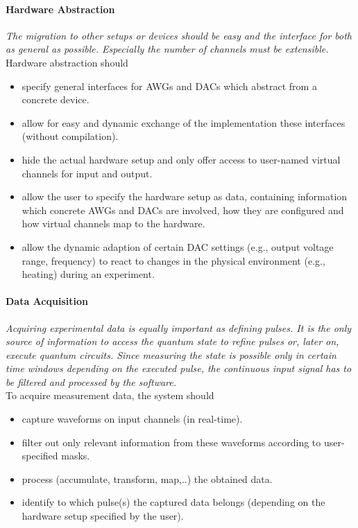 \documentclass[a4paper,12pt]{article}
\begin{document}
\paragraph{Hardware Abstraction}
\textit{The migration to other setups or devices should be easy and the interface for both as general as possible. Especially the number of channels must be extensible.}\\
Hardware abstraction should
\begin{itemize} \itemsep-0.5pt
 \item specify general interfaces for AWGs and DACs which abstract from a concrete device.
 \item allow for easy and dynamic exchange of the implementation these interfaces (without compilation).
 \item hide the actual hardware setup and only offer access to user-named virtual channels for input and output.
 \item allow the user to specify the hardware setup as data, containing information which concrete AWGs and DACs are involved, how they are configured and how virtual channels map to the hardware.
 \item allow the dynamic adaption of certain DAC settings (e.g., output voltage range, frequency) to react to changes in the physical environment (e.g., heating) during an experiment.
\end{itemize}

\paragraph{Data Acquisition}
\textit{Acquiring experimental data is equally important as defining pulses. It is the only source of information to access the quantum state to refine pulses or, later on, execute quantum circuits. Since measuring the state is possible only in certain time windows depending on the executed pulse, the continuous input signal has to be filtered and processed by the software.}\\
To acquire measurement data, the system should
\begin{itemize} \itemsep-0.5pt
 \item capture waveforms on input channels (in real-time).
 \item filter out only relevant information from these waveforms according to user-specified masks.
 \item process (accumulate, transform, map,..) the obtained data.
 \item identify to which pulse(s) the captured data belongs (depending on the hardware setup specified by the user).
\end{itemize}
\end{document}

